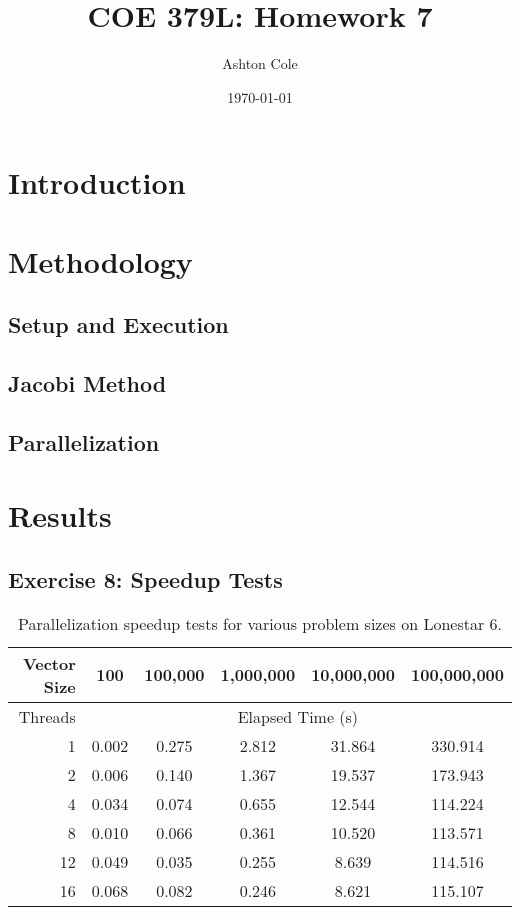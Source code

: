 \documentclass{article}
\title{COE 379L: Homework 7}
\author{Ashton Cole}
\date{\today}
\begin{document}
\maketitle

\section{Introduction}

\section{Methodology}

\subsection{Setup and Execution}

\subsection{Jacobi Method}

\subsection{Parallelization}

\section{Results}

\subsection{Exercise 8: Speedup Tests}

\begin{table}[h!]
	\centering
	\caption{Parallelization speedup tests for various problem sizes on Lonestar 6.}
	\label{tbl:speedup}
	\begin{tabular}{r|ccccc}
		Vector Size & 100 & 100,000 & 1,000,000 & 10,000,000 & 100,000,000 \\
		\hline
		Threads & \multicolumn{5}{c}{Elapsed Time (s)} \\
		\hline
		1 & 0.002 & 0.275 & 2.812 & 31.864 & 330.914 \\
		2 & 0.006 & 0.140 & 1.367 & 19.537 & 173.943 \\
		4 & 0.034 & 0.074 & 0.655 & 12.544 & 114.224 \\
		8 & 0.010 & 0.066 & 0.361 & 10.520 & 113.571 \\
		12 & 0.049 & 0.035 & 0.255 & 8.639 & 114.516 \\
		16 & 0.068 & 0.082 & 0.246 & 8.621 & 115.107
	\end{tabular}
\end{table}
\end{document}
